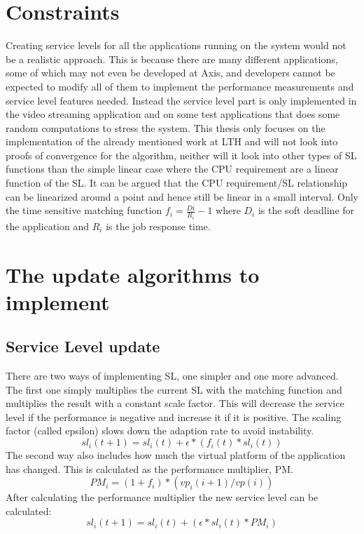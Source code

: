 \documentclass[nobiblatex]{LTHthesis}
\begin{document}
\section{Constraints} %
Creating service levels for all the applications running on the system would not be a realistic approach. This is because there are many different applications, some of which may not even be developed at Axis, and developers cannot be expected to modify all of them to implement the performance measurements and service level features needed. Instead the service level part is only implemented in the video streaming application and on some test applications that does some random computations to stress the system. This thesis only focuses on the implementation of the already mentioned work at LTH and will not look into proofs of convergence for the algorithm, neither will it look into other types of SL functions than the simple linear case where the CPU requirement are a linear function of the SL. It can be argued that the CPU requirement/SL relationship can be linearized around a point and hence still be linear in a small interval. Only the time sensitive matching function $f_{i}=\frac{D{i}}{R_{i}}-1$ where $D_{i}$ is the soft deadline for the application and $R_{i}$ is the job response time.







\section{The update algorithms to implement}


\subsection{Service Level update}
There are two ways of implementing SL, one simpler and one more advanced. The first one simply multiplies the current SL with the matching function and multiplies the result with a constant scale factor. This will decrease the service level if the performance is negative and increase it if it is positive. The scaling factor (called epsilon) slows down the adaption rate to avoid instability. 
\[sl_i(t+1)= sl_i(t) + \epsilon*(f_i(t)*sl_i(t)) \]
The second way also includes how much the virtual platform of the application has changed. This is calculated as the performance multiplier, PM.
\[PM_i = (1+f_i)*(vp_i(i+1)/vp(i))\]
After calculating the performance multiplier the new service level can be calculated:
\[sl_i(t+1)=sl_i(t) + (\epsilon*sl_i(t)*PM_i)\]
\end{document}
